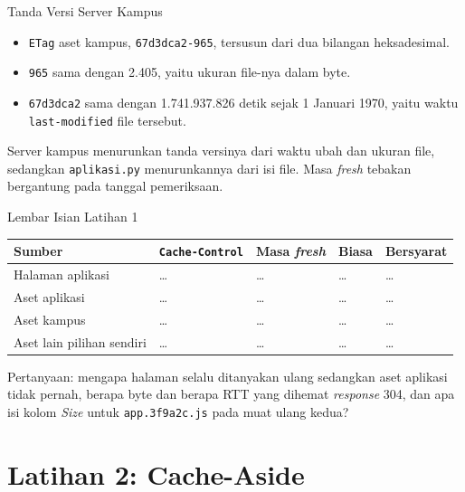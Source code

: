 \documentclass[aspectratio=169, table, 12pt]{beamer}
\begin{document}
\begin{frame}{{\Large Tanda Versi Server Kampus}}
  \vspace{10pt}
  \begin{itemize}
    \item \texttt{ETag} aset kampus, \texttt{67d3dca2-965}, tersusun dari dua
          bilangan heksadesimal.
    \item \texttt{965} sama dengan 2.405, yaitu ukuran file-nya dalam byte.
    \item \texttt{67d3dca2} sama dengan 1.741.937.826 detik sejak 1 Januari
          1970, yaitu waktu \texttt{last-modified} file tersebut.
  \end{itemize}
  \vspace{8pt}
  {\footnotesize Server kampus menurunkan tanda versinya dari waktu ubah dan
  ukuran file, sedangkan \texttt{aplikasi.py} menurunkannya dari isi file.
  Masa \textit{fresh} tebakan bergantung pada tanggal pemeriksaan.}
\end{frame}

\begin{frame}{{\Large Lembar Isian Latihan 1}}
  \vspace{4pt}
  \centering
  {\footnotesize
  \begin{tabularx}{\textwidth}{lXlll}
    \hline
    \textbf{Sumber} & \textbf{\texttt{Cache-Control}} & \textbf{Masa \textit{fresh}} & \textbf{Biasa} & \textbf{Bersyarat} \\
    \hline
    Halaman aplikasi & \dots & \dots & \dots & \dots \\
    \hline
    Aset aplikasi & \dots & \dots & \dots & \dots \\
    \hline
    Aset kampus & \dots & \dots & \dots & \dots \\
    \hline
    Aset lain pilihan sendiri & \dots & \dots & \dots & \dots \\
    \hline
  \end{tabularx}}

  \vspace{6pt}
  {\footnotesize Pertanyaan: mengapa halaman selalu ditanyakan ulang sedangkan
  aset aplikasi tidak pernah, berapa byte dan berapa RTT yang dihemat \textit{response}
  304, dan apa isi kolom \emph{Size} untuk \texttt{app.3f9a2c.js} pada muat
  ulang kedua?}
\end{frame}

\section{Latihan 2: Cache-Aside}
\end{document}

